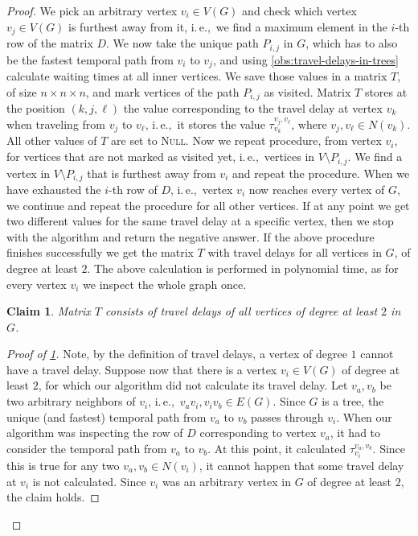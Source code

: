 \documentclass[11pt,a4paper]{article}
\newtheorem{claim}[theorem]{Claim}
\theoremstyle{remark}
\theoremstyle{definition}
\newcommand{\ie}{i.\,e.,\ }
\begin{document}
\begin{proof}
    We pick an arbitrary vertex $v_i \in V(G)$ and check which vertex $v_j \in V(G)$ is furthest away from it, \ie we find a maximum element in the $i$-th row of the matrix $D$.
    We now take the unique path $P_{i,j}$ in $G$, which has to also be the fastest temporal path from $v_i$ to $v_j$, and using \cref{obs:travel-delays-in-trees} calculate waiting times at all inner vertices.
    We save those values in a matrix $T$, of size $n \times n \times n$, and mark vertices of the path  $P_{i,j}$ as visited.
    Matrix $T$ stores at the position $(k,j,\ell)$ the value corresponding to the travel delay at vertex $v_k$ when traveling from $v_{j}$ to $v_{\ell}$, \ie it stores the value $\tau_{v_k}^{v_{j}, v_\ell}$, where $v_j,v_\ell \in N(v_k)$. All other values of $T$ are set to \textsc{Null}.
    Now we repeat procedure, from vertex $v_i$, for vertices that are not marked as visited yet, \ie vertices in $V \setminus P_{i,j}$.
    We find a vertex in $V \setminus P_{i,j}$ that is furthest away from $v_i$ and repeat the procedure.
    When we have exhausted the $i$-th row of $D$,
    \ie vertex $v_i$ now reaches every vertex of $G$,
    we continue and repeat the procedure for all other vertices.
    If at any point we get two different values for the same travel delay at a specific vertex, then we stop with the algorithm and return the negative answer.
    If the above procedure finishes successfully we get the matrix $T$ with travel delays for all vertices in $G$, of degree at least $2$.
    The above calculation is performed in polynomial time, as for every vertex $v_i$ we inspect the whole graph once.
    \begin{claim}\label{claim:matrixT-travelDelays-tree}
        Matrix $T$ consists of travel delays of all vertices of degree at least $2$ in $G$.
    \end{claim}
    \begin{proof}[Proof of \cref{claim:matrixT-travelDelays-tree}]
        Note, by the definition of travel delays, a vertex of degree $1$ cannot have a travel delay.
        Suppose now that there is a vertex $v_i \in V(G)$ of degree at least $2$, for which our algorithm did not calculate its travel delay.
        Let $v_a, v_b$ be two arbitrary neighbors of $v_i$, \ie $v_a v_i, v_i v_b \in E(G)$.
        Since $G$ is a tree, the unique (and fastest) temporal path from $v_a$ to $v_b$ passes through $v_i$.
        When our algorithm was inspecting the row of $D$ corresponding to vertex $v_a$, it had to consider the temporal path from $v_a$ to $v_b$. 
        At this point, it calculated $\tau_{v_i}^{v_a,v_b}$. 
        Since this is true for any two $v_a, v_b \in N(v_i)$, it cannot happen that some travel delay at $v_i$ is not calculated.
        Since $v_i$ was an arbitrary vertex in $G$ of degree at least $2$, the claim holds.
    \end{proof}
    

\end{proof}
\end{document}
